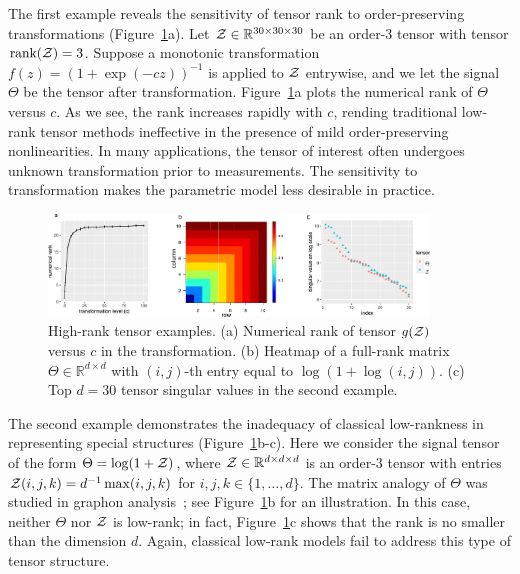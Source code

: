 \documentclass[11pt]{article}
\theoremstyle{exampstyle}
\theoremstyle{definition}
\begin{document}
The first example reveals the sensitivity of tensor rank to order-preserving transformations (Figure~\ref{fig:example}a). Let $\mathcal{Z} \in \mathbb{R}^{30\times 30\times 30}$ be an order-3 tensor with tensor $\text{rank}(\mathcal{Z})=3$. Suppose a monotonic transformation $f(z)=(1+\exp(-cz))^{-1}$ is applied to $\mathcal{Z}$ entrywise, and we let the signal $\Theta$ be the tensor after transformation. Figure~\ref{fig:example}a plots the numerical rank of $\Theta$ versus $c$. As we see, the rank increases rapidly with $c$, rending traditional low-rank tensor methods ineffective in the presence of mild order-preserving nonlinearities. In many applications, the tensor of interest often undergoes unknown transformation prior to measurements. The sensitivity to transformation makes the parametric model less desirable in practice. 

\begin{figure}[h]
\centering
\includegraphics[width=0.9\textwidth]{low_rank.pdf}
\caption{High-rank tensor examples. (a) Numerical rank of tensor $g(\mathcal{Z})$ versus $c$ in the transformation. (b) Heatmap of a full-rank matrix $\Theta\in\mathbb{R}^{d\times d}$ with $(i,j)$-th entry equal to $\log(1+\log(i,j))$. (c) Top $d = 30$ tensor singular values in the second example. }\label{fig:example}
\vspace{-.2cm}
\end{figure}

The second example demonstrates the inadequacy of classical low-rankness in representing special structures (Figure~\ref{fig:example}b-c). Here we consider the signal tensor of the form $\Theta=\log(1+\mathcal{Z})$, where $\mathcal{Z}\in\mathbb{R}^{d\times d\times d}$ is an order-3 tensor with entries $\mathcal{Z}(i,j,k)=d^{-1}\max(i,j,k)$ for $i,j,k\in\{1,\ldots,d\}$. The matrix analogy of $\Theta$ was studied in graphon analysis~\cite{chan2014consistent}; see Figure~\ref{fig:example}b for an illustration. In this case, neither $\Theta$ nor $\mathcal{Z}$ is low-rank; in fact, Figure~\ref{fig:example}c shows that the rank is no smaller than the dimension $d$. Again, classical low-rank models fail to address this type of tensor structure. 
\end{document}
